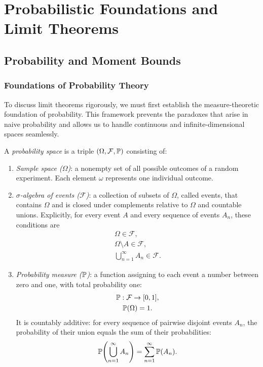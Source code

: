 \chapter{Probabilistic Foundations and Limit Theorems}

\section{Probability and Moment Bounds}

\subsection{Foundations of Probability Theory}

To discuss limit theorems rigorously, we must first establish the measure-theoretic foundation of probability. This framework prevents the paradoxes that arise in naive probability and allows us to handle continuous and infinite-dimensional spaces seamlessly.

\begin{definition}
A \textit{probability space} is a triple $(\Omega, \mathcal{F}, \mathbb{P})$ consisting of:
\begin{enumerate}
\item \textit{Sample space ($\Omega$)}: a nonempty set of all possible outcomes of a random experiment. Each element $\omega$ represents one individual outcome.
\item \textit{$\sigma$-algebra of events ($\mathcal{F}$)}: a collection of subsets of $\Omega$, called events, that contains $\Omega$ and is closed under complements relative to $\Omega$ and countable unions. Explicitly, for every event $A$ and every sequence of events $A_n$, these conditions are
\[
\begin{gathered}
\Omega \in \mathcal{F}, \\
\Omega \setminus A \in \mathcal{F}, \\
\bigcup_{n=1}^{\infty} A_n \in \mathcal{F}.
\end{gathered}
\]
\item \textit{Probability measure ($\mathbb{P}$)}: a function assigning to each event a number between zero and one, with total probability one:
\[
\begin{gathered}
\mathbb{P}: \mathcal{F} \to [0,1], \\
\mathbb{P}(\Omega) = 1.
\end{gathered}
\]
It is countably additive: for every sequence of pairwise disjoint events $A_n$, the probability of their union equals the sum of their probabilities:
\[
\mathbb{P}\!\left(\bigcup_{n=1}^{\infty} A_n\right)
= \sum_{n=1}^{\infty} \mathbb{P}(A_n).
\]
\end{enumerate}
\end{definition}

